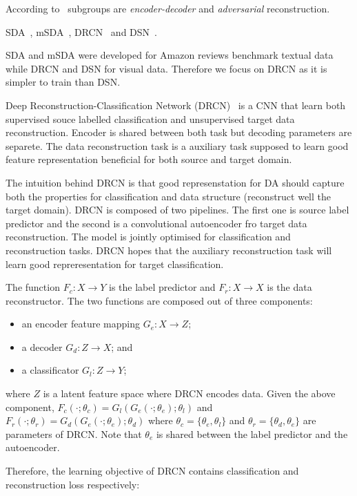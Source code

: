 According to~\cite{wang2018} subgroups are \textit{encoder-decoder} and
\textit{adversarial} reconstruction.

SDA~\cite{vincent2008, glorot2011}, mSDA~\cite{chen2012}, DRCN~\cite{ghifary2016} and DSN~\cite{bousmalis2016}.

SDA and mSDA were developed for Amazon reviews benchmark textual data
while DRCN and DSN for visual data.
Therefore we focus on DRCN as it is simpler to train than DSN.

Deep Reconstruction-Classification Network (DRCN)~\cite{ghifary2016} is a CNN
that learn both supervised souce labelled classification and unsupervised target data reconstruction.
Encoder is shared between both task but decoding parameters are separete.
The data reconstruction task is a auxiliary task supposed to learn good feature representation beneficial for both source and target domain.

The intuition behind DRCN is that good represenstation for DA
should capture both the properties for classification
and data structure (reconstruct well the target domain).
DRCN is composed of two pipelines.
The first one is source label predictor
and the second is a convolutional autoencoder fro target data reconstruction.
The model is jointly optimised for classification and reconstruction tasks.
DRCN hopes that the auxiliary reconstruction task will learn good repreresentation for target classification.

The function \(F_c: X \to Y\) is the label predictor
and \(F_r: X \to X\) is the data reconstructor.
The two functions are composed out of three components:

\begin{itemize}
	\item an encoder feature mapping \(G_e: X \to Z\);
	\item a decoder \(G_d: Z \to X\); and
	\item a classificator \(G_l: Z \to Y\);
\end{itemize}

where \(Z\) is a latent feature space where DRCN encodes data.
Given the above component,
\(F_c(\cdot; \theta_c) = G_l(G_e(\cdot; \theta_e); \theta_l)\)
and \(F_r(\cdot; \theta_r) = G_d(G_e(\cdot; \theta_e); \theta_d)\)
where \(\theta_c = \{\theta_e, \theta_l\}\)
and \(\theta_r = \{\theta_d, \theta_e\}\) are parameters of DRCN.
Note that \(\theta_e\) is shared between the label predictor and the autoencoder.

Therefore, the learning objective of DRCN contains classification and reconstruction loss respectively:

